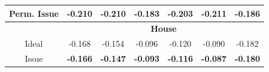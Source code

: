 \documentclass{beamer}
\begin{document}
{\begin{tabular}{|c|cccccc|}
    \hspace{-5pt} Perm. Issue \hspace{-5pt}
    & \hspace{-4pt} -0.210 \hspace{-5pt}
    & \hspace{-4pt} -0.210 \hspace{-5pt}
    & \hspace{-4pt} -0.183 \hspace{-5pt}
    & \hspace{-4pt} -0.203 \hspace{-5pt}
    & \hspace{-4pt} -0.211 \hspace{-5pt}
    & \hspace{-4pt} -0.186 \hspace{-4pt} \\
    \hline
    \hline
    & \multicolumn{6}{|c|}{\textbf{House}} \\
    \hline
    Ideal & \hspace{-4pt} -0.168 \hspace{-5pt}
    & \hspace{-4pt} -0.154 \hspace{-5pt}
    & \hspace{-4pt} -0.096 \hspace{-5pt}
    & \hspace{-4pt} -0.120 \hspace{-5pt}
    & \hspace{-4pt} -0.090 \hspace{-5pt}
    & \hspace{-4pt} -0.182 \hspace{-4pt} \\
    Issue
    & \hspace{-4pt} \textbf{-0.166} \hspace{-5pt}
    & \hspace{-4pt} \textbf{-0.147} \hspace{-5pt}
    & \hspace{-4pt} \textbf{-0.093} \hspace{-5pt}
    & \hspace{-4pt} \textbf{-0.116} \hspace{-5pt}
    & \hspace{-4pt} \textbf{-0.087} \hspace{-5pt}
    & \hspace{-4pt} \textbf{-0.180} \hspace{-4pt} \\

\end{tabular}}
\end{document}
